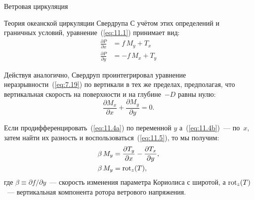 \begin{chapter}{Ветровая циркуляция}
\begin{section}{Теория океанской циркуляции Свердрупа}
С учётом этих определений и граничных условий, уравнение~(\ref{eq:11.1}) 
принимает вид:
\begin{subequations}\label{eq:11.4}
\begin{align}
 \frac{\partial{P}}{\partial{x}} &= f\,M_y + T_x  \label{eq:11.4a}\\
 \frac{\partial{P}}{\partial{y}} &= -f\,M_x + T_y \label{eq:11.4b}
\end{align}
\end{subequations}
%

Действуя аналогично, Свердруп проинтегрировал уравнение 
неразрывности~(\ref{eq:7.19}) по вертикали в тех же пределах, предполагая,
что вертикальная скорость на поверхности и на глубине~$-D$ равны нулю:
\begin{equation}\label{eq:11.5}
\frac{\partial{M_x}}{\partial{x}} + \frac{\partial{M_y}}{\partial{y}} = 0.
\end{equation}
%

Если продифференцировать~(\ref{eq:11.4a}) по переменной $y$ 
а~(\ref{eq:11.4b})~--- по~$x$, затем найти их разность и 
воспользоваться~(\ref{eq:11.5}), то мы получим:
\begin{align}\label{eq:11.6}
\beta\,M_y 
   &= \frac{\partial{T_y}}{\partial{x}} - \frac{\partial{T_x}}{\partial{y}},\notag \\
\beta\,M_y 
   &= \mathop{\mathrm{rot}}\nolimits_z(T),
\end{align}
где $\beta \equiv \partial{f}/\partial{y}$~--- скорость изменения параметра
Кориолиса с широтой, а $\mathop{\mathrm{rot}}\nolimits_z(T)$~--- вертикальная компонента ротора
ветрового напряжения.
%


\end{section}
\end{chapter}
